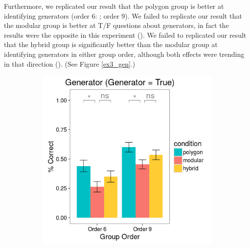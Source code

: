 \documentclass[11pt]{article}
\begin{document}
Furthermore, we replicated our result that the polygon group is better at identifying generators (order 6: ; order 9). We failed to replicate our result that the modular group is better at T/F questions about generators, in fact the results were the opposite in this experiment (). We failed to replicated our result that the hybrid group is significantly better than the modular group at identifying generators in either group order, although both effects were trending in that direction (). (See Figure \ref{ex3_gen}.)
\begin{figure}[H]
\centering
\begin{subfigure}[c]{0.4\textwidth}
\centering
\includegraphics[width=\textwidth]{figures/3/gen_T_r.png}
\end{subfigure}
~
\begin{subfigure}[c]{0.4\textwidth}
\centering

\end{subfigure}
\end{figure}
\end{document}
